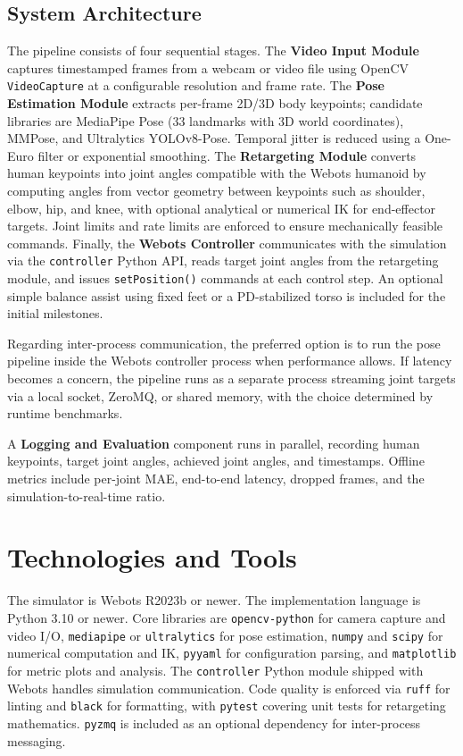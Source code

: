 \documentclass[conference]{IEEEtran}
\begin{document}
\subsection{System Architecture}
The pipeline consists of four sequential stages. The \textbf{Video Input Module} captures
timestamped frames from a webcam or video file using OpenCV \texttt{VideoCapture} at a
configurable resolution and frame rate. The \textbf{Pose Estimation Module} extracts per-frame
2D/3D body keypoints; candidate libraries are MediaPipe Pose (33 landmarks with 3D world
coordinates), MMPose, and Ultralytics YOLOv8-Pose. Temporal jitter is reduced using a
One-Euro filter or exponential smoothing. The \textbf{Retargeting Module} converts human
keypoints into joint angles compatible with the Webots humanoid by computing angles from
vector geometry between keypoints such as shoulder, elbow, hip, and knee, with optional
analytical or numerical IK for end-effector targets. Joint limits and rate limits are
enforced to ensure mechanically feasible commands. Finally, the \textbf{Webots Controller}
communicates with the simulation via the \texttt{controller} Python API, reads target joint
angles from the retargeting module, and issues \texttt{setPosition()} commands at each
control step. An optional simple balance assist using fixed feet or a PD-stabilized torso is
included for the initial milestones.
 
Regarding inter-process communication, the preferred option is to run the pose pipeline
inside the Webots controller process when performance allows. If latency becomes a concern,
the pipeline runs as a separate process streaming joint targets via a local socket, ZeroMQ,
or shared memory, with the choice determined by runtime benchmarks.
 
A \textbf{Logging and Evaluation} component runs in parallel, recording human keypoints,
target joint angles, achieved joint angles, and timestamps. Offline metrics include per-joint
MAE, end-to-end latency, dropped frames, and the simulation-to-real-time ratio.
 
\section{Technologies and Tools}
The simulator is Webots R2023b or newer. The implementation language is Python 3.10 or newer.
Core libraries are \texttt{opencv-python} for camera capture and video I/O,
\texttt{mediapipe} or \texttt{ultralytics} for pose estimation, \texttt{numpy} and
\texttt{scipy} for numerical computation and IK, \texttt{pyyaml} for configuration parsing,
and \texttt{matplotlib} for metric plots and analysis. The \texttt{controller} Python module
shipped with Webots handles simulation communication. Code quality is enforced via
\texttt{ruff} for linting and \texttt{black} for formatting, with \texttt{pytest} covering
unit tests for retargeting mathematics. \texttt{pyzmq} is included as an optional dependency
for inter-process messaging.
 
\end{document}
